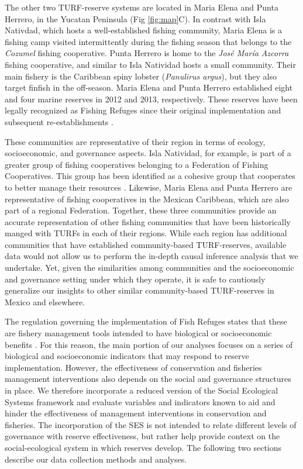 \documentclass{frontiersSCNS}
\begin{document}
The other two TURF-reserve systems are located in Maria Elena and Punta
Herrero, in the Yucatan Peninsula (Fig \ref{fig:map}C). In contrast with
Isla Nativdad, which hosts a well-established fishing community, Maria
Elena is a fishing camp visited intermittently during the fishing season
that belongs to the \emph{Cozumel} fishing cooperative. Punta Herrero is
home to the \emph{José María Azcorra} fishing cooperative, and similar
to Isla Natividad hosts a small community. Their main fishery is the
Caribbean spiny lobster (\emph{Panulirus argus}), but they also target
finfish in the off-season. Maria Elena and Punta Herrero established
eight and four marine reserves in 2012 and 2013, respectively. These
reserves have been legally recognized as Fishing Refuges since their
original implementation \citep{dof_website_2012,dof_website_2013} and
subsequent re-establishments \citep{dof_website_2017b}.

These communities are representative of their region in terms of
ecology, socioeconomic, and governance aspects. Isla Natividad, for
example, is part of a greater group of fishing cooperatives belonging to
a Federation of Fishing Cooperatives. This group has been identified as
a cohesive group that cooperates to better manage their resources
\citep{mccay_2014,mccay_2017,acevesbueno_2017}. Likewise, Maria Elena
and Punta Herrero are representative of fishing cooperatives in the
Mexican Caribbean, which are also part of a regional Federation.
Together, these three communities provide an accurate representation of
other fishing communities that have been historically manged with TURFs
in each of their regions. While each region has additional communities
that have established community-based TURF-reserves, available data
would not allow us to perform the in-depth causal inference analysis
that we undertake. Yet, given the similarities among communities and the
socioeconomic and governance setting under which they operate, it is
safe to cautiously generalize our insights to other similar
community-based TURF-reserves in Mexico and elsewhere.

The regulation governing the implementation of Fish Refuges states that
these are fishery management tools intended to have biological or
socioeconomic benefits \citep{nom}. For this reason, the main portion of
our analyses focuses on a series of biological and socioeconomic
indicators that may respond to reserve implementation. However, the
effectiveness of conservation and fisheries management interventions
also depends on the social and governance structures in place. We
therefore incorporate a reduced version of the Social Ecological Systems
framework \citep{ostrom_2009} and evaluate variables and indicators
known to aid and hinder the effectiveness of management interventions in
conservation and fisheries. The incorporation of the SES is not intended
to relate different levels of governance with reserve effectiveness, but
rather help provide context on the social-ecological system in which
reserves develop. The following two sections describe our data
collection methods and analyses.
\end{document}
